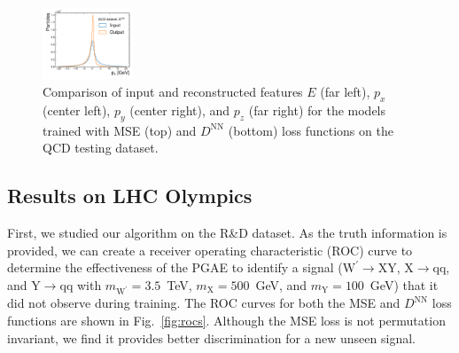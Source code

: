 \documentclass[letterpaper,11pt]{article}
\newcommand{\PWpr}{\ensuremath{\mathrm{W}^{\prime}}\xspace} %
\newcommand{\PX}{\ensuremath{\mathrm{X}}\xspace} %
\newcommand{\PY}{\ensuremath{\mathrm{Y}}\xspace} %
\newcommand{\Pq}{\ensuremath{\mathrm{q}}\xspace} %
\begin{document}
\begin{figure}[htpb]
\includegraphics[width=0.24\textwidth]{figures/gae_sparseloss/GNN_AE_EdgeConv_$p_z$.pdf}
\caption{Comparison of input and reconstructed features $E$ (far left), $p_x$ (center left), $p_y$ (center right), and $p_z$ (far right) for the models trained with MSE (top) and $D^\mathrm{NN}$ (bottom) loss functions on the QCD testing dataset.
}
\label{fig:reconstruction}
\end{figure}

\subsection{Results on LHC Olympics}


First, we studied our algorithm on the R\&D dataset.
As the truth information is provided, we can create a receiver operating characteristic (ROC) curve to determine the effectiveness of the PGAE to identify a signal ($\PWpr\to\PX\PY$, $\PX\to\Pq\Pq$, and $\PY\to\Pq\Pq$ with $m_{\PWpr} = 3.5$~TeV, $m_\PX = 500$~GeV, and $m_\PY= 100$~GeV) that it did not observe during training.
The ROC curves for both the MSE and $D^\mathrm{NN}$ loss functions are shown in Fig.~\ref{fig:rocs}.
Although the MSE loss is not permutation invariant, we find it provides better discrimination for a new unseen signal.
\end{document}
